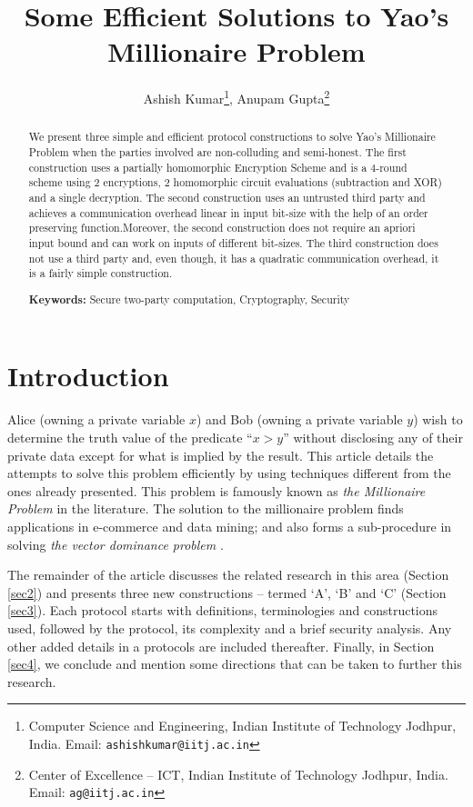 \documentclass[11pt, letterpaper, romanappendices, onecolumn]{article}
\title{Some Efficient Solutions to Yao's Millionaire Problem}
\author{Ashish Kumar\footnote{Computer Science and Engineering,
	Indian Institute of Technology Jodhpur, India. Email: \texttt{ashishkumar@iitj.ac.in}},
	Anupam Gupta\footnote{Center of Excellence -- ICT, Indian Institute of Technology Jodhpur, India. Email: \texttt{ag@iitj.ac.in}}
}
\theoremstyle{plain}\newtheorem{thm}{Theorem}[section]
\theoremstyle{definition}
\theoremstyle{remark}
\begin{document}
	\maketitle
\begin{abstract}
We present three simple and efficient protocol constructions to solve Yao's Millionaire Problem when the parties involved are non-colluding and semi-honest. The first construction uses a partially homomorphic Encryption Scheme and is a $4$-round scheme using $2$ encryptions, $2$ homomorphic circuit evaluations (subtraction and XOR) and a single decryption. The second construction uses an untrusted third party and achieves a communication overhead linear in input bit-size with the help of an order preserving function.Moreover, the second construction does not require an apriori input bound and can work on inputs of different bit-sizes. The third construction does not use a third party and, even though, it has a quadratic communication overhead, it is a fairly simple construction.
\newline 
\par \noindent \textbf{Keywords:} Secure two-party computation, Cryptography, Security
\end{abstract}

\section{Introduction}
Alice (owning a private variable $x$) and Bob (owning a private variable $y$) wish to determine the truth value of the predicate ``$x > y$'' without disclosing any of their private data except for what is implied by the result. This article details the attempts to solve this problem efficiently by using techniques different from the ones already presented. This problem is famously known as \textit{the Millionaire Problem} in the literature. The solution to the millionaire problem finds applications in e-commerce and data mining; and also forms a sub-procedure in solving \textit{the vector dominance problem} \cite{du2001study}.

\par The remainder of the article discusses the related research in this area (Section \ref{sec2}) and presents three new constructions -- termed `\textsf{A}', `\textsf{B}' and `\textsf{C}' (Section \ref{sec3}). Each protocol starts with definitions, terminologies and constructions used, followed by the protocol, its complexity and a brief security analysis. Any other added details in a protocols are included thereafter. Finally, in Section \ref{sec4}, we conclude and mention some directions that can be taken to further this research.
\end{document}
